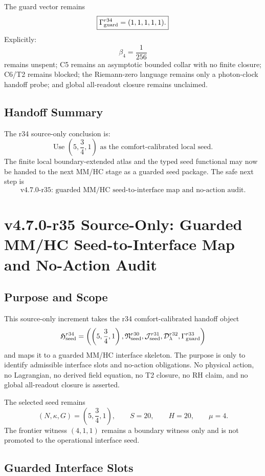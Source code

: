 The guard vector remains
\[
\boxed{
\Gamma_{\rm guard}^{r34}=(1,1,1,1,1).
}
\]
Explicitly:
\[
\beta_4=\frac1{256}
\]
remains unspent; C5 remains an asymptotic bounded collar with no finite closure;
C6/T2 remains blocked; the Riemann-zero language remains only a photon-clock
handoff probe; and global all-readout closure remains unclaimed.

\subsection{Handoff Summary}
\label{subsec:r34-handoff-summary}

The r34 source-only conclusion is:
\[
\boxed{
\text{Use }\left(5,\frac34,1\right)\text{ as the comfort-calibrated local seed.}
}
\]
The finite local boundary-extended atlas and the typed seed functional may now
be handed to the next MM/HC stage as a guarded seed package.  The safe next
step is
\[
\boxed{
\text{v4.7.0-r35: guarded MM/HC seed-to-interface map and no-action audit.}
}
\]


\section{v4.7.0-r35 Source-Only: Guarded MM/HC Seed-to-Interface Map and No-Action Audit}
\label{sec:v470-r35-seed-to-interface-no-action}

\subsection{Purpose and Scope}
\label{subsec:r35-purpose-scope}

This source-only increment takes the r34 comfort-calibrated handoff object
\[
\mathfrak H_{\rm seed}^{r34}
=
\left(
\left(5,\frac34,1\right),
\mathfrak N_{\rm seed}^{r30},
\mathcal J_{\rm seed}^{r31},
\mathcal D_{\lambda}^{r32},
\Gamma_{\rm guard}^{r33}
\right)
\]
and maps it to a guarded MM/HC interface skeleton.  The purpose is only to
identify admissible interface slots and no-action obligations.  No physical
action, no Lagrangian, no derived field equation, no T2 closure, no RH
claim, and no global all-readout closure is asserted.

The selected seed remains
\[
(N,\kappa,G)=\left(5,\frac34,1\right),
\qquad
S=20,
\qquad
H=20,
\qquad
\mu=4.
\]
The frontier witness \((4,1,1)\) remains a boundary witness only and is not
promoted to the operational interface seed.

\subsection{Guarded Interface Slots}
\label{subsec:r35-guarded-interface-slots}

